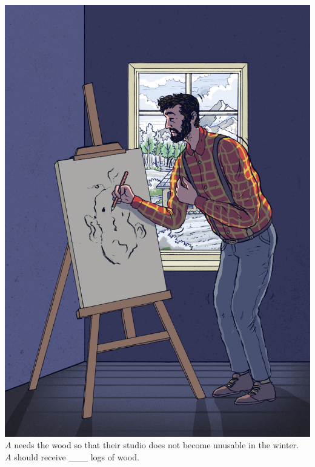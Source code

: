 \documentclass[egregdoesnotlikesansseriftitles]{scrartcl}
\begin{document}
\begin{minipage}[t]{.4\linewidth}
   \includegraphics[width=\linewidth]{figures/figure_1_d.jpg}
   $A$ needs the wood so that their studio does not become unusable in the winter.\\[2ex] $A$ should receive \_\_\_ logs of wood.
\end{minipage}
\hfill
\end{document}
